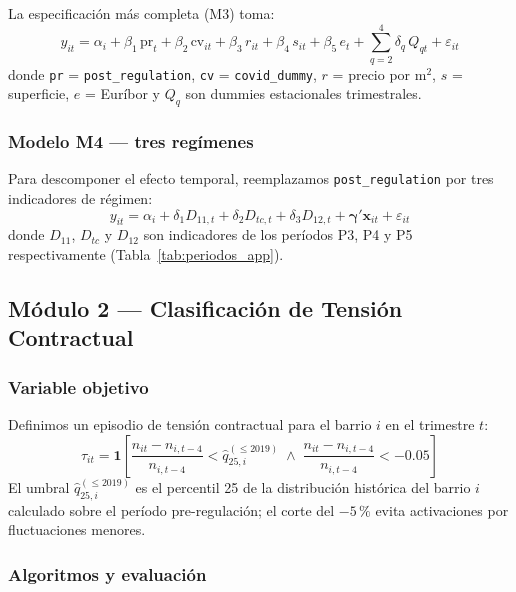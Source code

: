 \documentclass[10pt,a4paper,twocolumn]{article}
\begin{document}
La especificación más completa (M3) toma:
\begin{equation}
  y_{it} = \alpha_i + \beta_1\,\text{pr}_{t} + \beta_2\,\text{cv}_{it}
         + \beta_3\,r_{it} + \beta_4\,s_{it} + \beta_5\,e_t
         + \sum_{q=2}^{4}\!\delta_q\,Q_{qt} + \varepsilon_{it}
  \label{eq:m3}
\end{equation}
donde \texttt{pr} = \texttt{post\_regulation}, \texttt{cv} = \texttt{covid\_dummy},
$r$ = precio por m$^2$, $s$ = superficie, $e$ = Euríbor y $Q_q$ son dummies
estacionales trimestrales.

\subsubsection{Modelo M4 --- tres regímenes}

Para descomponer el efecto temporal, reemplazamos \texttt{post\_regulation} por tres
indicadores de régimen:
\begin{equation}
  y_{it} = \alpha_i + \delta_1 D_{11,t} + \delta_2 D_{tc,t} + \delta_3 D_{12,t}
         + \boldsymbol{\gamma}'\mathbf{x}_{it} + \varepsilon_{it}
  \label{eq:m4}
\end{equation}
donde $D_{11}$, $D_{tc}$ y $D_{12}$ son indicadores de los períodos P3, P4 y P5
respectivamente (Tabla~\ref{tab:periodos_app}).

\subsection{Módulo 2 --- Clasificación de Tensión Contractual}

\subsubsection{Variable objetivo}

Definimos un episodio de tensión contractual para el barrio $i$ en el trimestre $t$:
\begin{equation}
  \tau_{it} = \mathbf{1}\!\left[
    \frac{n_{it} - n_{i,t-4}}{n_{i,t-4}} < \hat{q}_{25,i}^{(\leq 2019)}
    \;\wedge\;
    \frac{n_{it} - n_{i,t-4}}{n_{i,t-4}} < -0.05
  \right]
  \label{eq:tension}
\end{equation}
El umbral $\hat{q}_{25,i}^{(\leq 2019)}$ es el percentil 25 de la distribución
histórica del barrio $i$ calculado sobre el período pre-regulación; el corte del
$-5\,\%$ evita activaciones por fluctuaciones menores.

\subsubsection{Algoritmos y evaluación}
\end{document}
